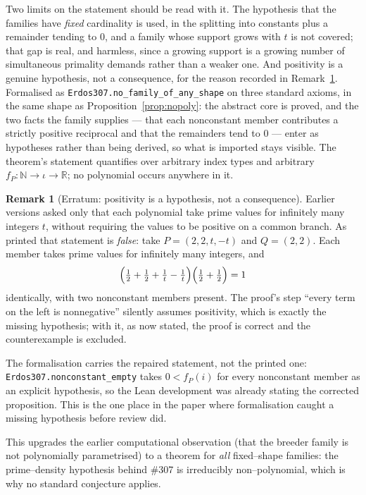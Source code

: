 \documentclass[11pt]{article}
\theoremstyle{definition}
\newtheorem{remark}[theorem]{Remark}
\begin{document}
Two limits on the statement should be read with it. The hypothesis that the families have
\emph{fixed} cardinality is used, in the splitting into constants plus a remainder tending to $0$, and
a family whose support grows with $t$ is not covered; that gap is real, and harmless, since a growing
support is a growing number of simultaneous primality demands rather than a weaker one. And
positivity is a genuine hypothesis, not a consequence, for the reason recorded in
Remark~\ref{rem:nopolyerratum}. Formalised as \texttt{Erdos307.no\_family\_of\_any\_shape} on three
standard axioms, in the same shape as Proposition~\ref{prop:nopoly}: the abstract core is proved, and
the two facts the family supplies --- that each nonconstant member contributes a strictly positive
reciprocal and that the remainders tend to $0$ --- enter as hypotheses rather than being derived, so
what is imported stays visible. The theorem's statement quantifies over arbitrary index types and
arbitrary $f_P:\mathbb{N}\to\iota\to\mathbb{R}$; no polynomial occurs anywhere in it.

\begin{remark}[Erratum: positivity is a hypothesis, not a consequence]\label{rem:nopolyerratum}
Earlier versions asked only that each polynomial take prime values for infinitely many integers $t$,
without requiring the values to be positive on a common branch. As printed that statement is
\emph{false}: take $P=(2,2,t,-t)$ and $Q=(2,2)$. Each member takes prime values for infinitely many
integers, and
\[ \Bigl(\tfrac12+\tfrac12+\tfrac1t-\tfrac1t\Bigr)\Bigl(\tfrac12+\tfrac12\Bigr)=1 \]
identically, with two nonconstant members present. The proof's step ``every term on the left is
nonnegative'' silently assumes positivity, which is exactly the missing hypothesis; with it, as now
stated, the proof is correct and the counterexample is excluded.

The formalisation carries the repaired statement, not the printed one:
\texttt{Erdos307.nonconstant\_empty} takes $0<f_P(i)$ for every nonconstant member as an explicit
hypothesis, so the Lean development was already stating the corrected proposition. This is the one
place in the paper where formalisation caught a missing hypothesis before review did.
\end{remark}

\noindent This upgrades the earlier computational observation (that the breeder family is not
polynomially parametrised) to a theorem for \emph{all} fixed--shape families: the prime--density
hypothesis behind \#307 is irreducibly non--polynomial, which is why no standard conjecture applies.
\end{document}
